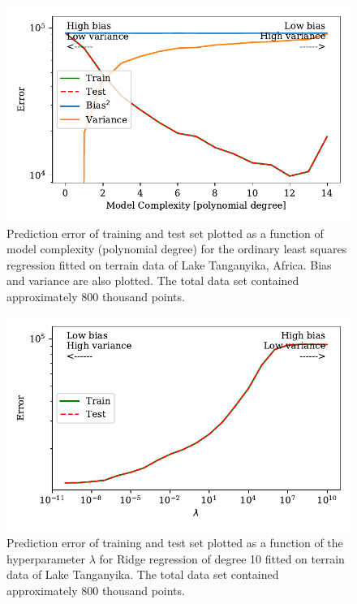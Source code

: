 \documentclass[a4paper, 10pt]{article}
\begin{document}
\begin{figure}[H]
    \includegraphics[scale=1]{figs/biasvariancetradeoff_ols_terrain.pdf}
    \caption{Prediction error of training and test set plotted as a function of model complexity (polynomial degree) for the ordinary least squares regression  fitted on terrain data of Lake Tanganyika, Africa. Bias and variance are also plotted. The total data set contained approximately 800 thousand points.}    
    \label{fig:bias_ols_terrain}
\end{figure}
\begin{figure}[H]
    \includegraphics{figs/biasvariancetradeoff_Ridge_terrain.pdf}
    \caption{Prediction error of training and test set plotted as a function of the hyperparameter $\lambda$ for Ridge regression of degree 10 fitted on terrain data of Lake Tanganyika. The total data set contained approximately 800 thousand points.}
    \label{fig:bias_ridge_terrain}
\end{figure}
\end{document}
